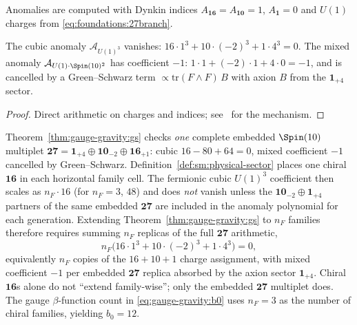 Anomalies are computed with Dynkin indices $A_{\mathbf{16}}=A_{\mathbf{10}}=1$,
$A_{\mathbf{1}}=0$ and $U(1)$ charges from \eqref{eq:foundations:27branch}.

\begin{theorem}\label{thm:gauge-gravity:gs}
The cubic anomaly $\mathcal{A}_{U(1)^3}$ vanishes:
$16\cdot1^3+10\cdot(-2)^3+1\cdot4^3=0$.
The mixed anomaly $\mathcal{A}_{U(1)\cdot\Spin(10)^2}$ has coefficient $-1$:
$1\cdot1+(-2)\cdot1+4\cdot0=-1$,
and is cancelled by a Green--Schwarz term $\propto\mathrm{tr}(F\wedge F)\,B$
with axion $B$ from the $\mathbf{1}_{+4}$ sector.
\end{theorem}

\begin{proof}
Direct arithmetic on charges and indices; see~\cite{GreenSchwarz1984} for the
mechanism.
\end{proof}

\begin{proposition}
\label{prop:gauge-gravity:anomaly-nF}
Theorem~\ref{thm:gauge-gravity:gs} checks \emph{one} complete embedded
$\Spin(10)$ multiplet
$\mathbf{27}=\mathbf{1}_{+4}\oplus\mathbf{10}_{-2}\oplus\mathbf{16}_{+1}$:
cubic $16-80+64=0$, mixed coefficient $-1$ cancelled by Green--Schwarz.
Definition~\ref{def:sm:physical-sector} places one chiral $\mathbf{16}$ in each horizontal
family cell. The fermionic cubic $U(1)^3$ coefficient then scales as
$n_F\cdot 16$ (for $n_F=3$, $48$) and does \emph{not} vanish unless the
$\mathbf{10}_{-2}\oplus\mathbf{1}_{+4}$ partners of the same embedded
$\mathbf{27}$ are included in the anomaly polynomial for each generation.
Extending Theorem~\ref{thm:gauge-gravity:gs} to $n_F$ families therefore
requires summing $n_F$ replicas of the full $\mathbf{27}$ arithmetic,
\[
  n_F\bigl(16\cdot1^3+10\cdot(-2)^3+1\cdot4^3\bigr)=0,
\]
equivalently $n_F$ copies of the $16+10+1$ charge assignment, with mixed
coefficient $-1$ per embedded $\mathbf{27}$ replica absorbed by the axion
sector $\mathbf{1}_{+4}$. Chiral $\mathbf{16}$s alone do not
``extend family-wise''; only the embedded $\mathbf{27}$ multiplet does.
The gauge $\beta$-function count in \eqref{eq:gauge-gravity:b0} uses
$n_F=3$ as the number of chiral families, yielding $b_0=12$.
\end{proposition}

